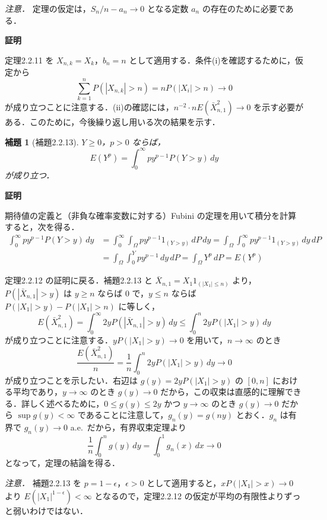 \documentclass[dvipdfmx]{jsarticle}
\makeatletter
\numberwithin{equation}{section}
\theoremstyle{plain}
\newtheorem{lem}[thm]{補題}
\renewenvironment{proof}[1][\proofname]{\par
  \pushQED{\qed}%
  \normalfont \topsep6\p@\@plus6\p@\relax
  \trivlist
  \item\relax
  {\bfseries
  #1\@addpunct{.}}\hspace\labelsep\ignorespaces
}{%
  \popQED\endtrivlist\@endpefalse
}
\renewcommand{\proofname}{証明}
\makeatother
\begin{document}
\emph{注意．} 定理の仮定は，$S_n/n - a_n \to 0$ となる定数 $a_n$ の存在のために必要である．

\begin{proof}
定理2.2.11 を $X_{n,k} = X_k$，$b_n = n$ として適用する．条件(i)を確認するために，仮定から
\[
  \sum_{k=1}^n P(|X_{n,k}| > n) = n P(|X_i| > n) \to 0
\]
が成り立つことに注意する．(ii)の確認には，$n^{-2} \cdot n E(\bar{X}_{n,1}^2) \to 0$ を示す必要がある．このために，今後繰り返し用いる次の結果を示す．
\end{proof}

\begin{lem}[補題2.2.13]
$Y \ge 0$，$p > 0$ ならば，
\[
  E(Y^p) = \int_0^\infty p y^{p-1} P(Y > y)\, dy
\]
が成り立つ．
\end{lem}

\begin{proof}
期待値の定義と（非負な確率変数に対する）Fubini の定理を用いて積分を計算すると，次を得る．
\begin{align*}
  \int_0^\infty p y^{p-1} P(Y > y)\, dy
  &= \int_0^\infty \int_\Omega p y^{p-1} 1_{(Y>y)}\, dP\, dy
   = \int_\Omega \int_0^\infty p y^{p-1} 1_{(Y>y)}\, dy\, dP \\
  &= \int_\Omega \int_0^Y p y^{p-1}\, dy\, dP
   = \int_\Omega Y^p\, dP = E(Y^p)
\end{align*}
\end{proof}

定理2.2.12 の証明に戻る．補題2.2.13 と $\bar{X}_{n,1} = X_1 1_{(|X_1| \le n)}$ より，$P(|\bar{X}_{n,1}| > y)$ は $y \ge n$ ならば $0$ で，$y \le n$ ならば $P(|X_1| > y) - P(|X_1| > n)$ に等しく，
\[
  E(\bar{X}_{n,1}^2) = \int_0^\infty 2y P(|\bar{X}_{n,1}| > y)\, dy \le \int_0^n 2y P(|X_1| > y)\, dy
\]
が成り立つことに注意する．$yP(|X_1| > y) \to 0$ を用いて，$n \to \infty$ のとき
\[
  \frac{E(\bar{X}_{n,1}^2)}{n} = \frac{1}{n} \int_0^n 2y P(|X_1| > y)\, dy \to 0
\]
が成り立つことを示したい．右辺は $g(y) = 2yP(|X_1| > y)$ の $[0,n]$ における平均であり，$y \to \infty$ のとき $g(y) \to 0$ だから，この収束は直感的に理解できる．詳しく述べるために，$0 \le g(y) \le 2y$ かつ $y \to \infty$ のとき $g(y) \to 0$ だから $\sup g(y) < \infty$ であることに注意して，$g_n(y) = g(ny)$ とおく．$g_n$ は有界で $g_n(y) \to 0$ a.e.\ だから，有界収束定理より
\[
  \frac{1}{n} \int_0^n g(y)\, dy = \int_0^1 g_n(x)\, dx \to 0
\]
となって，定理の結論を得る．

\emph{注意．} 補題2.2.13 を $p = 1 - \epsilon$，$\epsilon > 0$ として適用すると，$xP(|X_1| > x) \to 0$ より $E(|X_1|^{1-\epsilon}) < \infty$ となるので，定理2.2.12 の仮定が平均の有限性よりずっと弱いわけではない．
\end{document}
